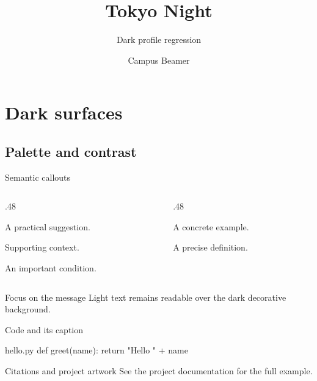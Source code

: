 \documentclass[theme=tokyo-night,language=english,cjk=false]{campusbeamer}
\title{Tokyo Night}
\subtitle{Dark profile regression}
\author{Campus Beamer}
\date{}
\begin{document}
\maketitle
\section{Dark surfaces}
\subsection{Palette and contrast}
\sectiontocpage[overview]
\begin{frame}{Semantic callouts}
  \begin{columns}[T,onlytextwidth]
    \begin{column}{.48\textwidth}
      \begin{tipbox}A practical suggestion.\end{tipbox}
      \begin{notebox}Supporting context.\end{notebox}
      \begin{alertbox}An important condition.\end{alertbox}
    \end{column}
    \begin{column}{.48\textwidth}
      \begin{examplebox}A concrete example.\end{examplebox}
      \begin{definitionbox}A precise definition.\end{definitionbox}
    \end{column}
  \end{columns}
\end{frame}
\begin{frame}[campusfocus,campusbackground=theme/tokyo-night/assets/backdrop.pdf,
  campusbackgroundopacity=.2]{Focus on the message}
  Light text remains readable over the dark decorative background.
\end{frame}
\begin{frame}[fragile]{Code and its caption}
\begin{campuscode}[language=Python,caption={A minimal greeting.}]{hello.py}
def greet(name):
    return "Hello " + name
\end{campuscode}
\end{frame}
\begin{frame}{Citations and project artwork}
  See the project documentation for the full example.
\end{frame}
\backmatter
\end{document}
